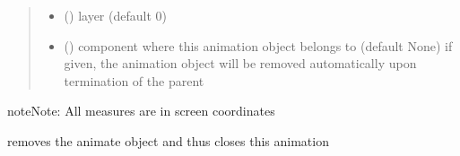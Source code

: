 \documentclass[letterpaper,10pt,english]{sphinxmanual}
\begin{document}
\begin{fulllineitems}
\begin{quote}
\begin{description}
\begin{itemize}
\item {} 
 () \textendash{} layer (default 0)

\item {} 
 ({\hyperref[\detokenize{Reference:salabim.Component}]{}}) \textendash{} component where this animation object belongs to (default None) 
if given, the animation object will be removed
automatically upon termination of the parent

\end{itemize}

\end{description}\end{quote}

\begin{sphinxadmonition}{note}{Note:}
All measures are in screen coordinates 
\end{sphinxadmonition}

\begin{fulllineitems}
\label{\detokenize{Reference:salabim.AnimateMonitor.remove}}
removes the animate object and thus closes this animation

\end{fulllineitems}


\end{fulllineitems}

\end{document}
